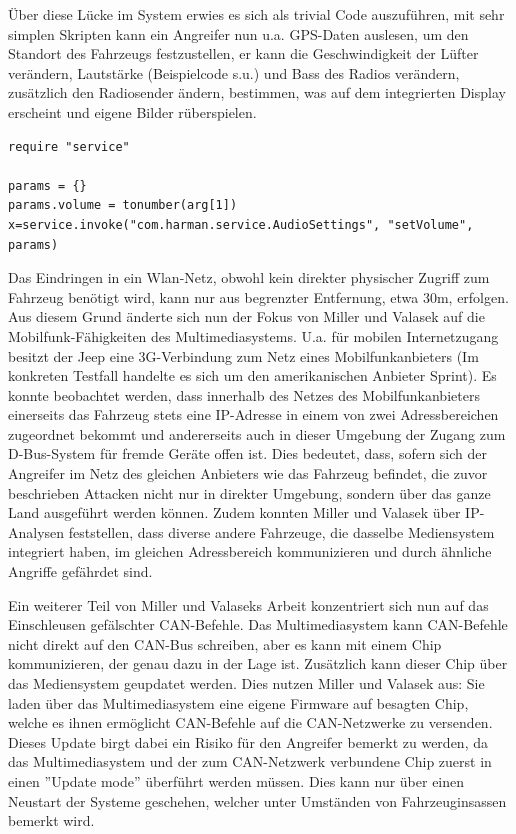 \documentclass[
    fontsize=12pt,
    headings=small,
    parskip=half,           %
    bibliography=totoc,9
    numbers=noenddot,       %
    open=any,               %
    ]{scrreprt}
\begin{document}
Über diese Lücke im System erwies es sich als trivial Code auszuführen, mit sehr simplen Skripten kann ein Angreifer nun u.a. GPS-Daten auslesen, um den Standort des Fahrzeugs festzustellen, er kann die Geschwindigkeit der Lüfter verändern, Lautstärke (Beispielcode s.u.) und Bass des Radios verändern, zusätzlich den Radiosender ändern, bestimmen, was auf dem integrierten Display erscheint und eigene Bilder rüberspielen. \\
\begin{lstlisting}[caption=Beispielskript zum Ändern der Lautstärke]
require "service"

params = {}
params.volume = tonumber(arg[1])
x=service.invoke("com.harman.service.AudioSettings", "setVolume", params)
\end{lstlisting}

Das Eindringen in ein Wlan-Netz, obwohl kein direkter physischer Zugriff zum Fahrzeug benötigt wird, kann nur aus begrenzter Entfernung, etwa 30m, erfolgen. Aus diesem Grund änderte sich nun der Fokus von Miller und Valasek auf die Mobilfunk-Fähigkeiten des Multimediasystems. U.a. für mobilen Internetzugang besitzt der Jeep eine 3G-Verbindung zum Netz eines Mobilfunkanbieters (Im konkreten Testfall handelte es sich um den amerikanischen Anbieter Sprint). Es konnte beobachtet werden, dass innerhalb des Netzes des Mobilfunkanbieters einerseits das Fahrzeug stets eine IP-Adresse in einem von zwei Adressbereichen zugeordnet bekommt und andererseits auch in dieser Umgebung der Zugang zum D-Bus-System für fremde Geräte offen ist. Dies bedeutet, dass, sofern sich der Angreifer im Netz des gleichen Anbieters wie das Fahrzeug befindet, die zuvor beschrieben  Attacken nicht nur in direkter Umgebung, sondern über das ganze Land ausgeführt werden können. Zudem konnten Miller und Valasek über IP-Analysen feststellen, dass diverse andere Fahrzeuge, die dasselbe Mediensystem integriert haben, im gleichen Adressbereich kommunizieren und durch ähnliche Angriffe gefährdet sind. \par
Ein weiterer Teil von Miller und Valaseks Arbeit konzentriert sich nun auf das Einschleusen gefälschter CAN-Befehle. Das Multimediasystem kann CAN-Befehle nicht direkt auf den CAN-Bus schreiben, aber es kann mit einem Chip kommunizieren, der genau dazu in der Lage ist. Zusätzlich kann dieser Chip über das Mediensystem geupdatet werden. Dies nutzen Miller und Valasek aus: Sie laden über das Multimediasystem eine eigene Firmware auf besagten Chip, welche es ihnen ermöglicht CAN-Befehle auf die CAN-Netzwerke zu versenden. Dieses Update birgt dabei ein Risiko für den Angreifer bemerkt zu werden, da das Multimediasystem und der zum CAN-Netzwerk verbundene Chip zuerst in einen ''Update mode'' überführt werden müssen. Dies kann nur über einen Neustart der Systeme geschehen, welcher unter Umständen von Fahrzeuginsassen bemerkt wird. \par
\end{document}
